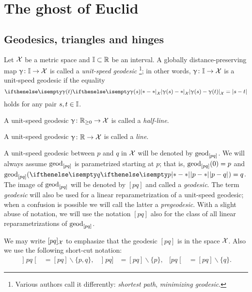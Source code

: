 \chapter{The ghost of Euclid}

\section{Geodesics, triangles and hinges}
\label{sec:geods}

Let $\mathcal{X}$ be a metric space 
and $\II\subset \R$\index{$\II$} be an interval. 
A globally distance-preserving map $\gamma\:\II\to \spc{X}$ is called a \emph{unit-speed geodesic}%
\footnote{Various authors call it differently: \emph{shortest path}, \emph{minimizing geodesic}.}; 
in other words, $\gamma\:\II\to \spc{X}$ is a unit-speed geodesic if the equality
\[\dist{\gamma(s)}{\gamma(t)}{\spc{X}}=|s-t|\]
holds for any pair $s,t\in \II$.

A unit-speed geodesic $\gamma\:\RR_{\ge0}\to \spc{X}$ is called a \emph{half-line}.

A unit-speed geodesic  $\gamma\:\RR\to \spc{X}$ is called a \emph{line}.

A unit-speed geodesic between $p$ and $q$ in $\mathcal{X}$ will be denoted by $\mathrm{geod}_{[p q]}$\index{$\geod_{[{*}{*}]}$}.
We will always assume $\mathrm{geod}_{[p q]}$ is parametrized starting at $p$; 
that is, $\mathrm{geod}_{[p q]}(0)=p$ and $\geod_{[p q]}(\dist{p}{q}{})=q$.
The image of $\mathrm{geod}_{[p q]}$ will be denoted by $[p q]$\index{$[{*}{*}]$} and called a \emph{geodesic}.
The term \emph{geodesic} will also be used for  a linear reparametrization of a unit-speed geodesic;
when a confusion is possible we will call the latter a \emph{pregeodesic}.
With a slight abuse of notation, we will use the notation $[p q]$ also for the class of all linear reparametrizations of $\mathrm{geod}_{[p q]}$.

We may write $[p q]_{\mathcal{X}}$ 
to emphasize that the geodesic $[p q]$ is in the space  ${\mathcal{X}}$.
Also we use the following short-cut notation:
\begin{align*}
\mathopen{]} p q \mathclose{[}&=[pq]\backslash\{p,q\},
&
\mathopen{]} p q ]&=[pq]\backslash\{p\},
&
[ p q \mathclose{[}&=[pq]\backslash\{q\}.
\end{align*}

